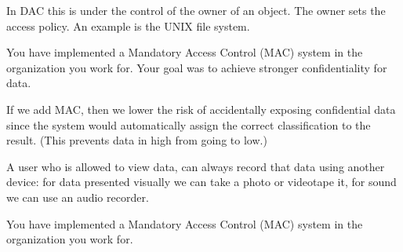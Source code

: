 \documentclass[a4paper,addpoints]{exam}
\begin{document}
\begin{questions}
\begin{solution}
    In DAC this is under the control of the owner of an object.
    The owner sets the access policy.
    An example is the UNIX file system.
  \end{solution}


  \question\label{q:accessctrl:E:C}
  You have implemented a Mandatory Access Control (MAC) system in the 
  organization you work for.
  Your goal was to achieve stronger confidentiality for data.

  \begin{solution}
    If we add MAC, then we lower the risk of accidentally exposing confidential 
    data since the system would automatically assign the correct classification 
    to the result.
    (This prevents data in high from going to low.)

    A user who is allowed to view data, can always record that data using 
    another device: for data presented visually we can take a photo or 
    videotape it, for sound we can use an audio recorder.
  \end{solution}


  \question\label{q:accessctrl:trustcomp:E:C:A}
  You have implemented a Mandatory Access Control (MAC) system in the 
  organization you work for.


\end{questions}
\end{document}
